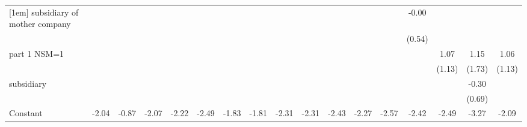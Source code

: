 \begin{table}[htbp]
\begin{tabular*}{0.8\hsize}{@{\hskip\tabcolsep\extracolsep\fill}l*{16}{c}}
[1em]
subsidiary of mother company&                     &                     &                     &                     &                     &                     &                     &                     &                     &                     &                     &                     &       -0.00         &                     &                     &                     \\
                    &                     &                     &                     &                     &                     &                     &                     &                     &                     &                     &                     &                     &      (0.54)         &                     &                     &                     \\
[1em]
part 1 NSM=1        &                     &                     &                     &                     &                     &                     &                     &                     &                     &                     &                     &                     &                     &        1.07         &        1.15         &        1.06         \\
                    &                     &                     &                     &                     &                     &                     &                     &                     &                     &                     &                     &                     &                     &      (1.13)         &      (1.73)         &      (1.13)         \\
[1em]
subsidiary          &                     &                     &                     &                     &                     &                     &                     &                     &                     &                     &                     &                     &                     &                     &       -0.30         &                     \\
                    &                     &                     &                     &                     &                     &                     &                     &                     &                     &                     &                     &                     &                     &                     &      (0.69)         &                     \\
[1em]
Constant            &       -2.04\sym{***}&       -0.87\sym{***}&       -2.07\sym{***}&       -2.22\sym{***}&       -2.49\sym{***}&       -1.83\sym{***}&       -1.81         &       -2.31\sym{***}&       -2.31\sym{***}&       -2.43\sym{***}&       -2.27\sym{***}&       -2.57\sym{***}&       -2.42\sym{**} &       -2.49\sym{***}&       -3.27\sym{***}&       -2.09\sym{**} \\

\end{tabular*}
\end{table}

